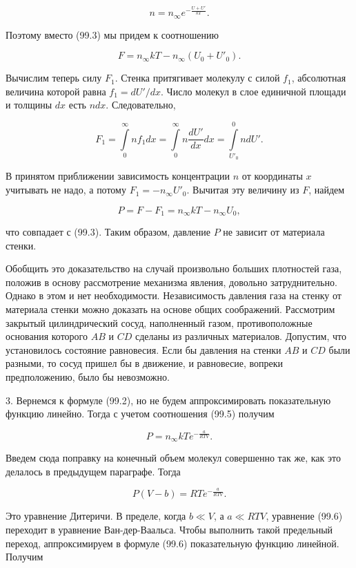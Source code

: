 \documentclass[12pt]{article} %
\begin{document}
$$
n = n_\infty e^{-\frac{U + U'}{kT}}.
$$

Поэтому вместо (99.3) мы придем к соотношению

$$
F = n_\infty kT - n_\infty (U_0 + U'_0).
$$

Вычислим теперь силу $F_1$. Стенка притягивает молекулу с силой $f_1$, абсолютная величина которой равна $f_1 = dU'/dx$. Число молекул в слое единичной площади и толщины $dx$ есть $ndx$. Следовательно,

$$
F_1 = \int\limits_0^\infty n f_1 dx = \int\limits_0^\infty n \frac{dU'}{dx} dx = \int\limits_{U'_0}^0 ndU'.
$$

В принятом приближении зависимость концентрации $n$ от координаты $x$ учитывать не надо, а потому $F_1 = -n_\infty U'_0$. Вычитая эту величину из $F$, найдем

$$
P = F - F_1 = n_\infty kT - n_\infty U_0,
$$

что совпадает с (99.3). Таким образом, давление $P$ не зависит от материала стенки.

Обобщить это доказательство на случай произвольно больших плотностей газа, положив в основу рассмотрение механизма явления, довольно затруднительно. Однако в этом и нет необходимости. Независимость давления газа на стенку от материала стенки можно доказать на основе общих соображений. Рассмотрим закрытый цилиндрический сосуд, наполненный газом, противоположные основания которого $AB$ и $CD$ сделаны из различных материалов. Допустим, что установилось состояние равновесия. Если бы давления на стенки $AB$ и $CD$ были разными, то сосуд пришел бы в движение, и равновесие, вопреки предположению, было бы невозможно.



3. Вернемся к формуле (99.2), но не будем аппроксимировать показательную функцию линейно. Тогда с учетом соотношения (99.5) получим

$$
P = n_\infty kTe^{-\frac{a}{RTV}}.
$$

Введем сюда поправку на конечный объем молекул совершенно так же, как это делалось в предыдущем параграфе. Тогда

\begin{equation}
P(V - b) = RT e^{-\frac{a}{RTV}}. \tag{99.6}
\end{equation}

Это уравнение Дитеричи. В пределе, когда $b \ll V$, а $a \ll RTV$, уравнение (99.6) переходит в уравнение Ван-дер-Ваальса. Чтобы выполнить такой предельный переход, аппроксимируем в формуле (99.6) показательную функцию линейной. Получим
\end{document}
